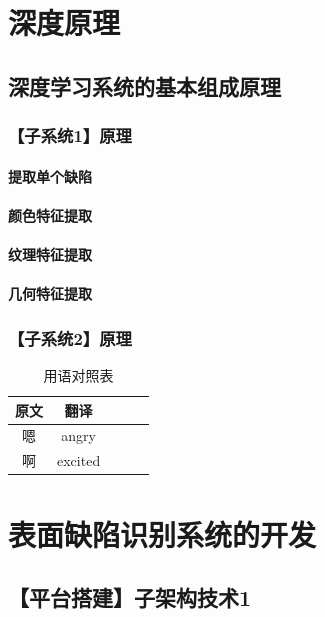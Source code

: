 \chapter{深度原理}
\section{深度学习系统的基本组成原理}
\subsection{【子系统1】原理}
\subsubsection{提取单个缺陷}
\subsubsection{颜色特征提取}
\subsubsection{纹理特征提取}
\subsubsection{几何特征提取}
\subsection{【子系统2】原理}

\begin{table}[htbp]
	\caption{用语对照表}\label{table}
	\vspace{0.5em}\centering\wuhao
	\begin{tabular}{ccccc}
		\toprule[1.5pt]
		原文 & 翻译 \\
		\midrule[1pt]
		嗯 & angry \\
		啊 & excited \\
		\bottomrule[1.5pt]
	\end{tabular}
	\vspace{\baselineskip}
\end{table}


\chapter{表面缺陷识别系统的开发}
\section{【平台搭建】子架构技术1}
